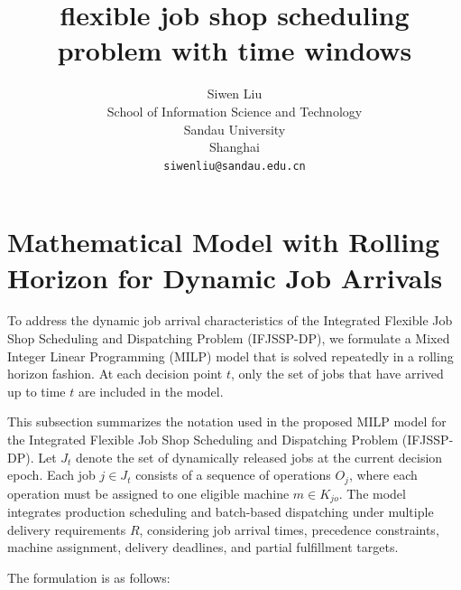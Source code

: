 \documentclass{article}
\title{flexible job shop scheduling problem with time windows}
\author{
 Siwen Liu \\
  School of Information Science and Technology\\
  Sandau University\\
  Shanghai \\
  \texttt{siwenliu@sandau.edu.cn} \\
}
\begin{document}
\maketitle
\begin{abstract}

\end{abstract}

\section{Mathematical Model with Rolling Horizon for Dynamic Job Arrivals}

To address the dynamic job arrival characteristics of the Integrated Flexible Job Shop Scheduling and Dispatching Problem (IFJSSP-DP), we formulate a Mixed Integer Linear Programming (MILP) model that is solved repeatedly in a rolling horizon fashion. At each decision point \( t \), only the set of jobs that have arrived up to time \( t \) are included in the model.

This subsection summarizes the notation used in the proposed MILP model for the Integrated Flexible Job Shop Scheduling and Dispatching Problem (IFJSSP-DP). Let \( J_t \) denote the set of dynamically released jobs at the current decision epoch. Each job \( j \in J_t \) consists of a sequence of operations \( O_j \), where each operation must be assigned to one eligible machine \( m \in K_{jo} \). The model integrates production scheduling and batch-based dispatching under multiple delivery requirements \( R \), considering job arrival times, precedence constraints, machine assignment, delivery deadlines, and partial fulfillment targets.

The formulation is as follows:
\end{document}
